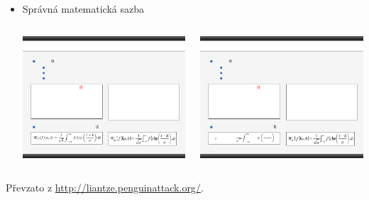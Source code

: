 \begin{frame}[t]
\begin{itemize}
\begin{columns}[t]
\begin{column}{0.45\textwidth}
				\end{column}
			\end{columns}
		\item Správná matematická sazba
			\begin{columns}[t]
				\begin{column}{0.45\textwidth}
					\includegraphics[width=\columnwidth]{Lecture1/Figures/EquationSample1.pdf}
				\end{column}
				\begin{column}{0.45\textwidth}
					\includegraphics[width=\columnwidth]{Lecture1/Figures/EquationSample2.pdf}
				\end{column}
			\end{columns}
	\end{itemize}
	\begin{center}
		\tiny
		Převzato z \url{http://liantze.penguinattack.org/}.
	\end{center}
\end{frame}


